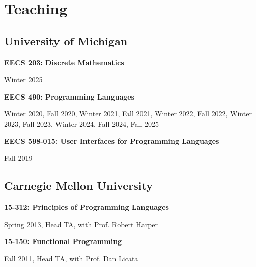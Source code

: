 \documentclass[10pt,letterpaper]{article}
\renewenvironment{itemize}{
  \begin{list}{}{
    \setlength{\leftmargin}{1.25em}
    \setlength{\itemsep}{0.25em}
    \setlength{\parskip}{0pt}
    \setlength{\parsep}{0.2em}
  }
}{
  \end{list}
}
\begin{document}
%


\section*{Teaching}
\subsection*{University of Michigan}
\begin{itemize}
  \item \textbf{EECS 203: Discrete Mathematics}
      \begin{itemize}
        \item Winter 2025
      \end{itemize}
  \item \textbf{EECS 490: Programming Languages}
        \begin{itemize}
          \item Winter 2020, Fall 2020, Winter 2021, Fall 2021, Winter 2022, Fall 2022, Winter 2023, Fall 2023, Winter 2024, Fall 2024, Fall 2025
        \end{itemize}
  \item \textbf{EECS 598-015: User Interfaces for Programming Languages}
        \begin{itemize}
          \item Fall 2019
        \end{itemize}
\end{itemize}

\subsection*{Carnegie Mellon University}
\begin{itemize}
  \item \textbf{15-312: Principles of Programming Languages}
        \begin{itemize}
          \item Spring 2013, Head TA, with Prof. Robert Harper
        \end{itemize}
  \item \textbf{15-150: Functional Programming}
        \begin{itemize}
          \item Fall 2011, Head TA, with Prof. Dan Licata
        \end{itemize}
\end{itemize}
\end{document}
